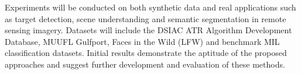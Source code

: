 
Experiments will be conducted on both synthetic data and real applications such as target detection, scene understanding and semantic segmentation in remote sensing imagery.  Datasets will include the DSIAC ATR Algorithm Development Database, MUUFL Gulfport, Faces in the Wild (LFW) and benchmark MIL classification datasets.  Initial results demonstrate the aptitude of the proposed approaches and suggest further development and evaluation of these methods.




